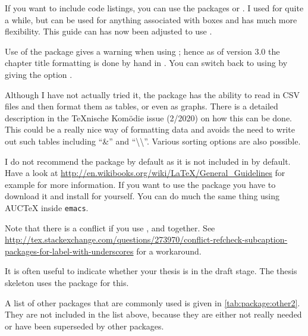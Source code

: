 If you want to include code listings,
you can use the packages  or .
I used  for quite a while,
but  can be used for anything associated with boxes and
has much more flexibility.
This guide can has now been adjusted to use .

Use of the  package gives a warning when using \KOMAScript{}; hence
as of version 3.0 the chapter title formatting is done by hand in .
You can switch back to using  by giving the option .

Although I have not actually tried it,
the  package has the ability to read in CSV files and
then format them as tables, or even as graphs.
There is a detailed description in the \TeX nische Komödie issue (2/2020)
on how this can be done.
This could be a really nice way of formatting data
and avoids the need to write out such tables including \enquote{\&} and \enquote{\textbackslash\textbackslash}.
Various sorting options are also possible.

I do not recommend the  package by default as it is not
included in \TeXLive by default. Have a look at
\url{http://en.wikibooks.org/wiki/LaTeX/General_Guidelines} for
example for more information. If you want to use the package you have
to download it and install for yourself. You can do much the same
thing using AUCTeX inside \texttt{emacs}.

\begin{sloppypar}
Note that there is a conflict if you use ,  and  together.
See \url{http://tex.stackexchange.com/questions/273970/conflict-refcheck-subcaption-packages-for-label-with-underscores} for a workaround.
\end{sloppypar}

It is often useful to indicate whether your thesis is in the draft stage.
The thesis skeleton uses the package  for this.

A list of other packages that are commonly used is given in
\cref{tab:package:other2}. They are not
included in the list above, because they are either not really needed
or have been superseded by other packages.

